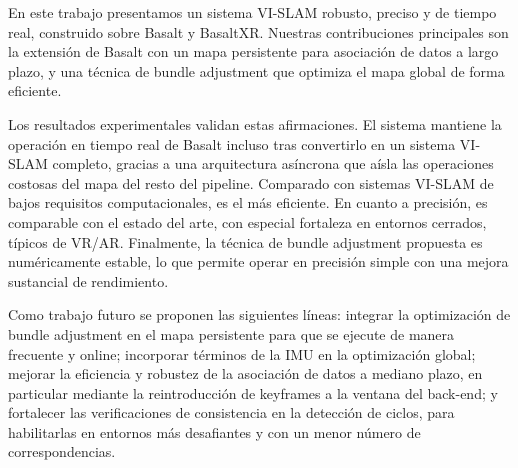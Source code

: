 En este trabajo presentamos un sistema VI-SLAM robusto, preciso y de tiempo real, construido sobre Basalt y BasaltXR. Nuestras contribuciones principales son la extensión de Basalt con un mapa persistente para asociación de datos a largo plazo, y una técnica de bundle adjustment que optimiza el mapa global de forma eficiente.

Los resultados experimentales validan estas afirmaciones. El sistema mantiene la operación en tiempo real de Basalt incluso tras convertirlo en un sistema VI-SLAM completo, gracias a una arquitectura asíncrona que aísla las operaciones costosas del mapa del resto del pipeline. Comparado con sistemas VI-SLAM de bajos requisitos computacionales, es el más eficiente. En cuanto a precisión, es comparable con el estado del arte, con especial fortaleza en entornos cerrados, típicos de VR/AR. Finalmente, la técnica de bundle adjustment propuesta es numéricamente estable, lo que permite operar en precisión simple con una mejora sustancial de rendimiento.

Como trabajo futuro se proponen las siguientes líneas: integrar la optimización de bundle adjustment en el mapa persistente para que se ejecute de manera frecuente y online; incorporar términos de la IMU en la optimización global; mejorar la eficiencia y robustez de la asociación de datos a mediano plazo, en particular mediante la reintroducción de keyframes a la ventana del back-end; y fortalecer las verificaciones de consistencia en la detección de ciclos, para habilitarlas en entornos más desafiantes y con un menor número de correspondencias.

